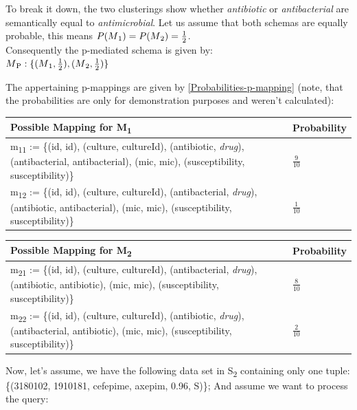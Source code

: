 To break it down, the two clusterings show whether \textit{antibiotic} or \textit{antibacterial} are semantically equal to \textit{antimicrobial}. Let us assume that both schemas are equally probable, this means $ P(M\textsubscript{1}) = P(M\textsubscript{2}) =  \frac{1}{2} $.\\
Consequently the p-mediated schema is given by:\\
$M\textsubscript{P}: \{(M\textsubscript{1}, \frac{1}{2}), (M\textsubscript{2}, \frac{1}{2})\}$\\
\raggedright
The appertaining p-mappings are given by \ref{Probabilities-p-mapping} (note, that the probabilities are only for demonstration purposes and weren't calculated):\\
\centering
\begin{tabular}{|p{}|p{}|}
\hline
 \textbf{Possible Mapping for M\textsubscript{1}}  &  \textbf{Probability}\\ \hline
 m\textsubscript{11} := \{(id, id), (culture, cultureId), (antibiotic,  \textit{drug}), (antibacterial, antibacterial), (mic, mic), (susceptibility, susceptibility)\}   &  $ \frac{9}{10} $\\ \hline
 m\textsubscript{12} :=  \{(id, id), (culture, cultureId), (antibacterial,  \textit{drug}), (antibiotic, antibacterial), (mic, mic), (susceptibility, susceptibility)\}   &  $ \frac{1}{10} $\\ \hline
\end{tabular}
\begin{tabular}{|p{}|p{}|}
\hline
 \textbf{Possible Mapping for M\textsubscript{2}}  &  \textbf{Probability}\\ \hline
  m\textsubscript{21} := \{(id, id), (culture, cultureId), (antibacterial,  \textit{drug}), (antibiotic, antibiotic), (mic, mic), (susceptibility, susceptibility)\}   &  $ \frac{8}{10} $\\ \hline
  m\textsubscript{22} := \{(id, id), (culture, cultureId), (antibiotic,  \textit{drug}), (antibacterial, antibiotic), (mic, mic), (susceptibility, susceptibility)\}   &  $ \frac{2}{10} $\\ \hline
\end{tabular}
\label{Probabilities-p-mapping}
\raggedright
Now, let's assume, we have the following data set in S\textsubscript{2} containing only one tuple: \{(3180102, 1910181, cefepime, axepim, 0.96, S)\};
And assume we want to process the query:\newline\\

